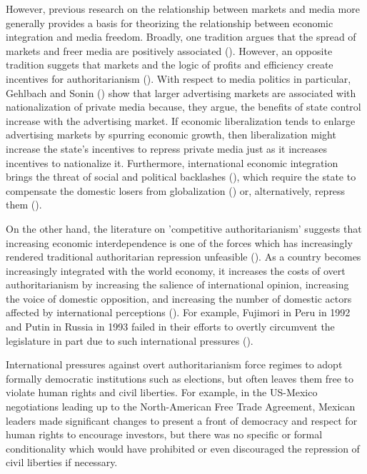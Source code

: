\documentclass[12pt]{report}
\begin{document}
However, previous research on the relationship between markets and
media more generally provides a basis for theorizing the relationship
between economic integration and media freedom. Broadly, one tradition
argues that the spread of markets and freer media are positively associated
(\citealt{Habermas:1991vg,Islam:2002uc,Islam:2003tu}). However, an
opposite tradition suggets that markets and the logic of profits and
efficiency create incentives for authoritarianism (\citealt{Huntington:1975vt}).
With respect to media politics in particular, Gehlbach and Sonin (\citeyear{Gehlbach:2011ky})
show that larger advertising markets are associated with nationalization
of private media because, they argue, the benefits of state control
increase with the advertising market. If economic liberalization tends
to enlarge advertising markets by spurring economic growth, then liberalization
might increase the state's incentives to repress private media just
as it increases incentives to nationalize it. Furthermore, international
economic integration brings the threat of social and political backlashes
(\citealt{Bussmann:2007vx}), which require the state to compensate
the domestic losers from globalization (\citealt{Rodrik:1998te})
or, alternatively, repress them (\citealt{Adsera:2002vt}).

On the other hand, the literature on 'competitive authoritarianism'
suggests that increasing economic interdependence is one of the forces
which has increasingly rendered traditional authoritarian repression
unfeasible (\citealt[60, 62]{Levitsky:2002gx}). As a country becomes
increasingly integrated with the world economy, it increases the costs
of overt authoritarianism by increasing the salience of international
opinion, increasing the voice of domestic opposition, and increasing
the number of domestic actors affected by international perceptions
(\citealt{Levitsky:2006ex}). For example, Fujimori in Peru in 1992
and Putin in Russia in 1993 failed in their efforts to overtly circumvent
the legislature in part due to such international pressures (\citealt[56]{Levitsky:2002gx}).

International pressures against overt authoritarianism force regimes
to adopt formally democratic institutions such as elections, but often
leaves them free to violate human rights and civil liberties. For
example, in the US-Mexico negotiations leading up to the North-American
Free Trade Agreement, Mexican leaders made significant changes to
present a front of democracy and respect for human rights to encourage
investors, but there was no specific or formal conditionality which
would have prohibited or even discouraged the repression of civil
liberties if necessary.
\end{document}
